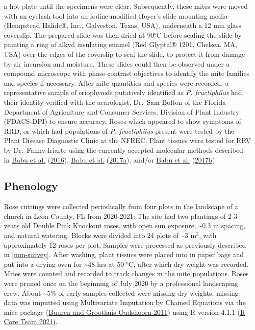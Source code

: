 \documentclass[12pt,final,CPage]{ufthesis}
\begin{document}
{a hot plate until the specimens were clear. Subsequently, these mites were moved with an eyelash tool into an iodine-modified Hoyer's slide mounting media (Hempstead Halide®, Inc., Galveston, Texas, USA), underneath a 12 \si{\milli\metre} glass coverslip. The prepared slide was then dried at 90°C before sealing the slide by painting a ring of alkyd insulating enamel (Red Glyptal® 1201, Chelsea, MA, USA) over the edges of the coverslip to seal the slide, to protect it from damage by air incursion and moisture. These slides could then be observed under a compound microscope with phase-contrast objectives to identify the mite families and species if necessary. After mite quantities and species were recorded, a representative sample of eriophyoids putatively identified as \emph{P. fructiphilus} had their identity verified with the acarologist, Dr.~Sam Bolton of the Florida Department of Agriculture and Consumer Services, Division of Plant Industry (FDACS-DPI) to ensure accuracy. Roses which appeared to show symptoms of RRD, or which had populations of \emph{P. fructiphilus} present were tested by the Plant Disease Diagnostic Clinic at the NFREC. Plant tissues were tested for RRV by Dr.~Fanny Iriarte using the currently accepted molecular methods described in \protect\hyperlink{ref-Babu2016}{Babu et al.} (\protect\hyperlink{ref-Babu2016}{2016}), \protect\hyperlink{ref-Babu2017a}{Babu et al.} (\protect\hyperlink{ref-Babu2017a}{2017a}), and/or \protect\hyperlink{ref-Babu2017b}{Babu et al.} (\protect\hyperlink{ref-Babu2017b}{2017b}).

  \hypertarget{mm-pheno}{%
  \subsection{Phenology}\label{mm-pheno}}

  Rose cuttings were collected periodically from four plots in the landscape of a church in Leon County, FL from 2020-2021: The site had two plantings of 2-3 years old Double Pink Knockout roses, with open sun exposure, \textasciitilde0.3 \si{\metre} spacing, and natural watering. Blocks were divided into 24 plots of \textasciitilde3 \si{\metre}\(^2\), with approximately 12 roses per plot. Samples were processed as previously described in \ref{mm-survey}. After washing, plant tissues were placed into in paper bags and put into a drying oven for \textasciitilde48 hrs at 50 °C, after which dry weight was recorded. Mites were counted and recorded to track changes in the mite populations. Roses were pruned once on the beginning of July 2020 by a professional landscaping crew. About \textasciitilde5\% of early samples collected were missing dry weights, missing data was imputted using Multivariate Imputation by Chained Equations via the mice package (\protect\hyperlink{ref-vanBuuren2011}{Buuren and Groothuis-Oudshoorn 2011}) using R version 4.1.1 (\protect\hyperlink{ref-RCT2021}{R Core Team 2021}).

}
\end{document}
